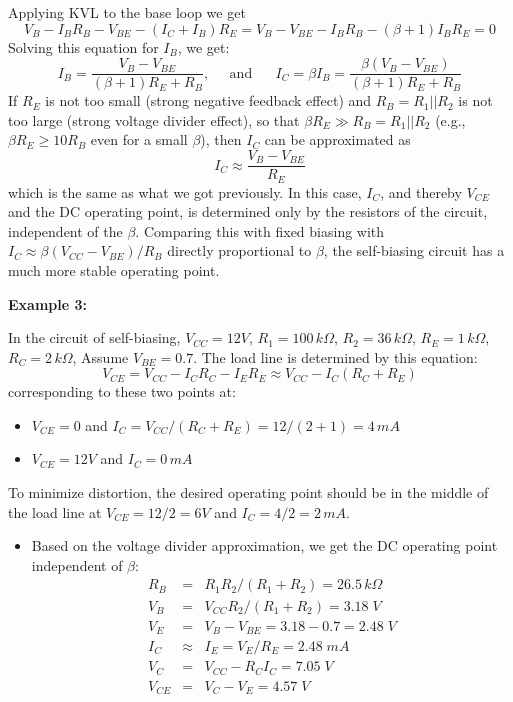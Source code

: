 \begin{itemize}
\begin{itemize}
  Applying KVL to the base loop we get 
  \[
  V_B-I_BR_B-V_{BE}-(I_C+I_B)R_E=V_B-V_{BE}-I_BR_B-(\beta+1)I_BR_E=0 
  \]
  Solving this equation for $I_B$, we get:
  \[
  I_B=\frac{V_B-V_{BE}}{(\beta+1) R_E+R_B},\;\;\;\;\;\mbox{and}\;\;\;\;\;\;
  I_C =\beta I_B=\frac{\beta(V_B-V_{BE})}{(\beta+1) R_E+R_B} 
  \]
  If $R_E$ is not too small (strong negative feedback effect) and 
  $R_B=R_1||R_2$ is not too large (strong voltage divider effect), 
  so that $\beta R_E \gg R_B=R_1||R_2$ (e.g., $\beta R_E \ge 10 R_B$ 
  even for a small $\beta$), then $I_C$ can be approximated as
  \[
  I_C \approx \frac{V_B-V_{BE}}{R_E} 
  \]
  which is the same as what we got previously. In this case, $I_C$, and 
  thereby $V_{CE}$ and the DC operating point, is determined only by the
  resistors of the circuit, independent of the $\beta$. Comparing this 
  with fixed biasing with $I_C \approx \beta (V_{CC}-V_{BE})/R_B$ directly 
  proportional to $\beta$, the self-biasing circuit has a much more stable 
  operating point.
\end{itemize}

{\bf Example 3:} 

In the circuit of self-biasing, $V_{CC}=12V$, $R_1=100\,k\Omega$, 
$R_2=36\,k\Omega$, $R_E=1\,k\Omega$, $R_C=2\,k\Omega$, Assume 
$V_{BE}=0.7$. The load line is determined by this equation:
\[
V_{CE}=V_{CC}-I_CR_C-I_ER_E\approx V_{CC}-I_C(R_C+R_E)
\]
corresponding to these two points at:
\begin{itemize}
\item $V_{CE}=0$ and $I_C=V_{CC}/(R_C+R_E)=12/(2+1)=4\,mA$
\item $V_{CE}=12V$ and $I_C=0\,mA$
\end{itemize}

To minimize distortion, the desired operating point should be in the 
middle of the load line at $V_{CE}=12/2=6V$ and $I_C=4/2=2\,mA$.

\begin{itemize}
\item Based on the voltage divider approximation, we get the DC
operating point independent of $\beta$:
\begin{eqnarray}
  R_B&=&R_1R_2/(R_1+R_2)=26.5\,k\Omega	
  \nonumber\\
  V_B&=&V_{CC} R_2/(R_1+R_2)=3.18\;V
  \nonumber\\
  V_E&=&V_B-V_{BE}=3.18-0.7=2.48\;V
  \nonumber\\
  I_C&\approx& I_E=V_E/R_E=2.48\;mA
  \nonumber\\
  V_C&=&V_{CC}-R_CI_C=7.05\;V
  \nonumber\\
  V_{CE}&=&V_C-V_E=4.57\;V 
  \nonumber
\end{eqnarray}


\end{itemize}
\end{itemize}
